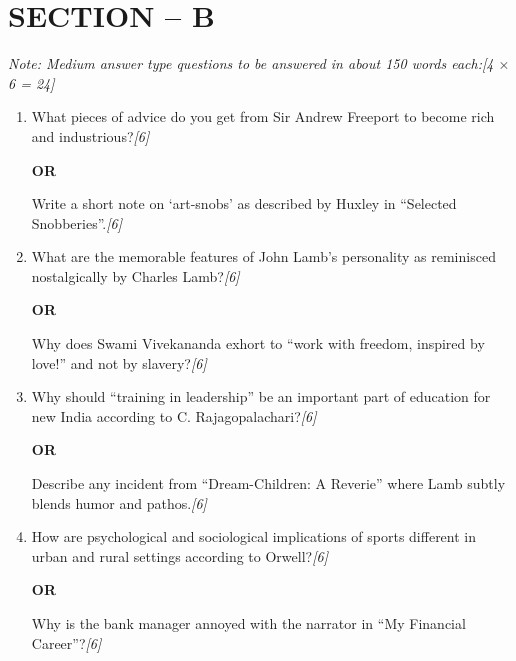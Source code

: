 \documentclass[11pt,a4paper]{article}
\newcommand{\pts}[1]{\hfill \textit{[#1]}}
\begin{document}
\bigskip

\section*{SECTION -- B}
\noindent \textit{Note: Medium answer type questions to be answered in about 150 words each:}\pts{4 $\times$ 6 = 24}

\begin{enumerate}[label=\textbf{\arabic*.},leftmargin=*,start=4,itemsep=10pt]

  \item What pieces of advice do you get from Sir Andrew Freeport to become rich and industrious?\pts{6}

  \begin{center}\textbf{OR}\end{center}

  Write a short note on `art-snobs' as described by Huxley in ``Selected Snobberies''.\pts{6}

  \item What are the memorable features of John Lamb's personality as reminisced nostalgically by Charles Lamb?\pts{6}

  \begin{center}\textbf{OR}\end{center}

  Why does Swami Vivekananda exhort to ``work with freedom, inspired by love!'' and not by slavery?\pts{6}

  \item Why should ``training in leadership'' be an important part of education for new India according to C. Rajagopalachari?\pts{6}

  \begin{center}\textbf{OR}\end{center}

  Describe any incident from ``Dream-Children: A Reverie'' where Lamb subtly blends humor and pathos.\pts{6}

  \item How are psychological and sociological implications of sports different in urban and rural settings according to Orwell?\pts{6}

  \begin{center}\textbf{OR}\end{center}

  Why is the bank manager annoyed with the narrator in ``My Financial Career''?\pts{6}

\end{enumerate}
\end{document}
